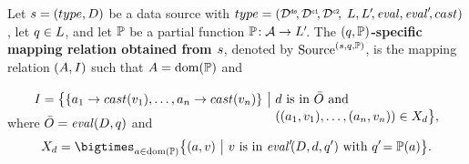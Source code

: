 \vspace{-1mm} %

\begin{definition}
	\label{def:source_operator}
	\normalfont
	Let $s = (type,D)$ be a data source with
		$type = (\mathcal{D}^\texttt{\tiny ds}\!, \mathcal{D}^\texttt{\tiny c1}\!, \mathcal{D}^\texttt{\tiny c2}\!,$ $L, L'\!, \mathit{eval}, \mathit{eval}'\!, cast)$,
		let
	$q \in L$, and
		let
	$\mathbb{P}$ be a partial function
	$\mathbb{P} \!: \mathcal{A}  \rightarrow L'\!$.
	The \textbf{$(q, \mathbb{P})$-spe\-cif\-ic mapping relation obtained from $s$}, denoted by $\textrm{Source}^{(s,q,\mathbb{P})}$, is the mapping relation $(A, I)$ such that $A = \mathrm{dom}(\mathbb{P})$ and

	\begin{align*}
		\symMappingInst = \big\{ \{\attr_1 \rightarrow \fctTypeCast{\var_1}, \dots, \attr_n \rightarrow \fctTypeCast{\var_n} \} \ \big| \
		 & \dataObject \text{ is in } \symDataSeq \text{ and}  %
		\\[-1mm]
		 & ((\attr_1 , \var_1), \dots, (\attr_n , \var_n)) \in X_d \big\}
		,
\\[-6mm] %
	\end{align*}
	where $\bar{O} = \mathit{eval}(D,q)$ and%
\vspace{-2mm} %
	\begin{equation*}
		X_d = \bigtimes_{\attr \in \fctDom{\symAttrQueryMap}}
		\big\{ (\attr, \var) \ \big| \
		\var \text{ is in } \fctCbeval{\bigDataObject}{\dataObject}{\queryExpr'} %
		\text{ with }  \queryExpr'\! = \symAttrQueryMap(\attr) \big\}
		.
	\end{equation*}
\end{definition}


